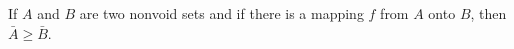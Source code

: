 If $A$ and $B$ are two nonvoid sets and if there is a mapping $f$ from $A$ onto $B$, then $\bar{A} \geq \bar{B}$.